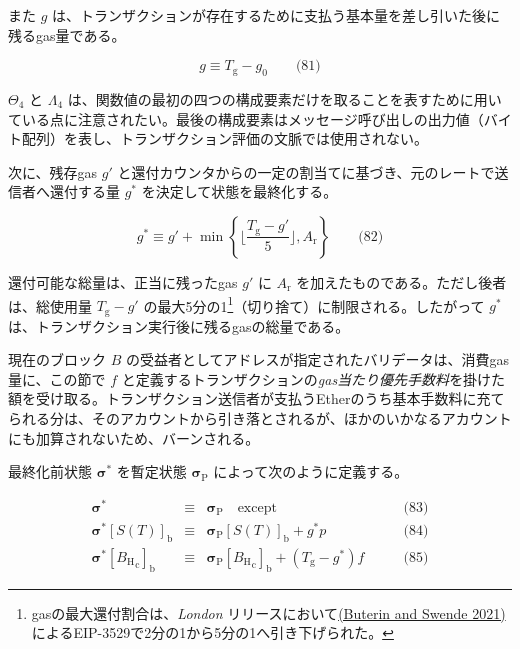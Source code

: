 \documentclass[
]{ltjsarticle}
\begin{document}
また \(g\)
は、トランザクションが存在するために支払う基本量を差し引いた後に残るgas量である。

\protect\hypertarget{eq-81}{}{}

\[g \equiv T_{\mathrm{g}} - g_0 \qquad \text{(81)}\]

\(\Theta_{4}\) と \(\Lambda_{4}\)
は、関数値の最初の四つの構成要素だけを取ることを表すために用いている点に注意されたい。最後の構成要素はメッセージ呼び出しの出力値（バイト配列）を表し、トランザクション評価の文脈では使用されない。

次に、残存gas \(g'\)
と還付カウンタからの一定の割当てに基づき、元のレートで送信者へ還付する量
\(g^{*}\) を決定して状態を最終化する。

\protect\hypertarget{eq-82}{}{}

\[g^{*} \equiv g' + \min \left\{ \Big\lfloor \dfrac{T_{\mathrm{g}} - g'}{5} \Big\rfloor, A_{\mathrm{r}} \right\} \qquad \text{(82)}\]

還付可能な総量は、正当に残ったgas \(g'\) に
\protect\hyperlink{refund_balance_defn_words_A__r}{\(A_{\mathrm{r}}\)}
を加えたものである。ただし後者は、総使用量 \(T_{\mathrm{g}} - g'\)
の最大5分の1\footnote{gasの最大還付割合は、\emph{London}
  リリースにおいて\protect\hyperlink{ref-EIP-3529}{(Buterin and Swende
  2021)}によるEIP-3529で2分の1から5分の1へ引き下げられた。}（切り捨て）に制限される。したがって
\(g^{*}\) は、トランザクション実行後に残るgasの総量である。

現在のブロック \(B\)
の受益者としてアドレスが指定されたバリデータは、消費gas量に、この節で
\protect\hyperlink{priority_fee_f}{\(f\)}
と定義するトランザクションの\emph{gas当たり優先手数料}を掛けた額を受け取る。トランザクション送信者が支払うEtherのうち基本手数料に充てられる分は、そのアカウントから引き落とされるが、ほかのいかなるアカウントにも加算されないため、バーンされる。

最終化前状態 \(\boldsymbol{\sigma}^{*}\) を暫定状態
\(\boldsymbol{\sigma}_{\mathrm{P}}\) によって次のように定義する。

\protect\hypertarget{eq-83}{}{}\protect\hypertarget{eq-84}{}{}\protect\hypertarget{eq-85}{}{}

\[\begin{aligned}
\boldsymbol{\sigma}^{*} & \equiv & \boldsymbol{\sigma}_{\mathrm{P}} \quad \text{except} & \qquad \text{(83)} \\
\boldsymbol{\sigma}^{*}[S(T)]_{\mathrm{b}} & \equiv & \boldsymbol{\sigma}_{\mathrm{P}}[S(T)]_{\mathrm{b}} + g^{*} p & \qquad \text{(84)} \\
\boldsymbol{\sigma}^{*}[{B_{\mathrm{H}}}_{\mathrm{c}}]_{\mathrm{b}} & \equiv & \boldsymbol{\sigma}_{\mathrm{P}}[{B_{\mathrm{H}}}_{\mathrm{c}}]_{\mathrm{b}} + (T_{\mathrm{g}} - g^{*}) f & \qquad \text{(85)}
\end{aligned}\]
\end{document}
